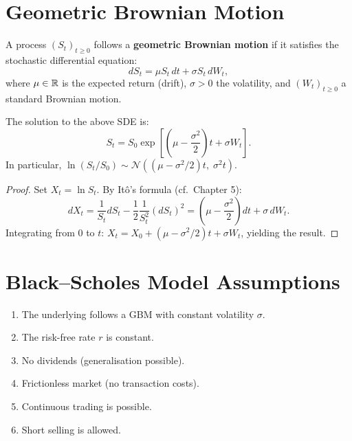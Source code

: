 \section{Geometric Brownian Motion}

\begin{definition}
A process $(S_t)_{t \geq 0}$ follows a \textbf{geometric Brownian motion}
if it satisfies the stochastic differential equation:
\[
    dS_t = \mu S_t \, dt + \sigma S_t \, dW_t,
\]
where $\mu \in \mathbb{R}$ is the expected return (drift), $\sigma > 0$ the
volatility, and $(W_t)_{t \geq 0}$ a standard Brownian motion.
\end{definition}

\begin{theorem}
\label{thm:gbm_solution}
The solution to the above SDE is:
\[
    S_t = S_0 \exp\!\left[\left(\mu - \frac{\sigma^2}{2}\right)t
          + \sigma W_t\right].
\]
In particular, $\ln(S_t/S_0) \sim \mathcal{N}\!\left((\mu - \sigma^2/2)t,\;
\sigma^2 t\right)$.
\end{theorem}

\begin{proof}
Set $X_t = \ln S_t$. By It\^o's formula (cf.\ Chapter 5):
\[
    dX_t = \frac{1}{S_t}dS_t - \frac{1}{2}\frac{1}{S_t^2}(dS_t)^2
         = \left(\mu - \frac{\sigma^2}{2}\right)dt + \sigma\, dW_t.
\]
Integrating from $0$ to $t$:
$X_t = X_0 + (\mu - \sigma^2/2)t + \sigma W_t$,
yielding the result.
\end{proof}

\section{Black--Scholes Model Assumptions}

\begin{warning}[title=\textbf{Fundamental Assumptions}]
\begin{enumerate}
    \item The underlying follows a GBM with constant volatility $\sigma$.
    \item The risk-free rate $r$ is constant.
    \item No dividends (generalisation possible).
    \item Frictionless market (no transaction costs).
    \item Continuous trading is possible.
    \item Short selling is allowed.
\end{enumerate}
\end{warning}

